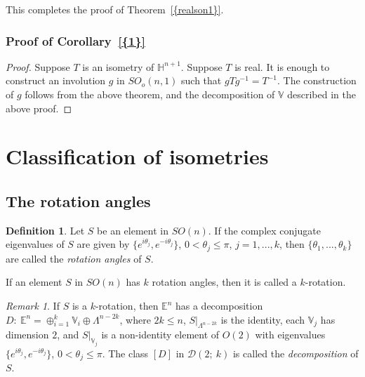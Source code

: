 \documentclass[11pt]{amsart}
\theoremstyle{definition}
\newtheorem{definition}[theorem]{Definition}
\theoremstyle{remark}
\newtheorem{remark}[theorem]{Remark}
\numberwithin{equation}{section}
\theoremstyle{plain}
\begin{document}
This completes the proof of {Theorem~\ref{{realson1}}}. 

\subsubsection{Proof of {Corollary~\ref{{1}}}}
\begin{proof}
Suppose $T$ is an isometry of ${\mathbb H}^{n+1}$. Suppose $T$ is real. It is enough to construct an involution $g$ in $SO_o(n,1)$ such that $gTg^{-1}=T^{-1}$. The construction of $g$  follows from the above theorem, and the decomposition of ${\mathbb V}$ described in the above proof.  
\end{proof}

\section{Classification of isometries}\label{class}
\subsection{The rotation angles}\label{ra}

\begin{definition}
 Let $S$ be an element in $SO(n)$. If the complex conjugate eigenvalues of $S$ are given by $\{e^{i\theta_j}, e^{-i\theta_j}\}$, $0 < \theta_j \leq \pi$, $j=1,...,k$, then $\{ \theta_1,...,\theta_k \}$ are called the \emph{rotation angles} of $S$. 

If an element $S$ in $SO(n)$ has $k$ rotation angles, then it is called a $k$-rotation.  
\end{definition}

\begin{remark}\label{krd}
If $S$ is a $k$-rotation, then ${\mathbb E}^n$ has a decomposition $D: \ {\mathbb E}^n=\oplus_{i=1}^k {\mathbb V}_i \oplus \Lambda^{n-2k}$, where $2k \leq n$, $S|_{\Lambda^{n-2k}}$ is the identity, each ${\mathbb V}_j$ has dimension $2$, and $S|_{{\mathbb V}_j}$ is a non-identity element of $O(2)$ with eigenvalues $\{e^{i \theta_j}, e^{-i \theta_j}\}$, $0<\theta_j\leq \pi$. The class $[D]$ in ${\mathcal D}(2; \ k)$ is called the \emph{decomposition} of $S$. 
\end{remark}
\end{document}
